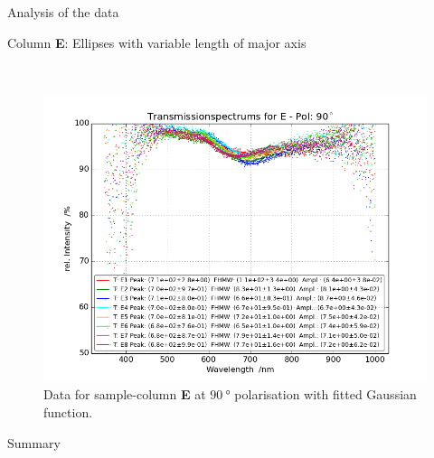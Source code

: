 \documentclass[pdftex, a4paper,11pt, twoside, UKenglish]{report}
\begin{document}
\begin{chapter}{Analysis of the data}
\begin{section}{Column \textbf{E}: Ellipses with variable length of
        major axis}
\begin{figure}[ht!]
\begin{minipage}{.95\textwidth}
          \label{fig:TransspecFIT_EPol0}
        \end{minipage}\\
        \begin{minipage}{.95\textwidth}
          \centering
          \includegraphics[width=\textwidth]
              {Figures/TransspecFIT_EPol90.png}
          \caption{Data for sample-column \textbf{E} at $\SI{90}{\degree}$
              polarisation with fitted Gaussian function.}
          \label{fig:TransspecFIT_EPol90}
        \end{minipage}
      \end{figure}
      
    \end{section}
    
    
    
    \begin{section}{Summary}
      \label{chp:AnalysisSummary}
      
      
      
    \end{section}
   
  \end{chapter}
  
  
  
  
  
  
  
  \begin{thebibliography}{99}
    \scriptsize
    
  \end{thebibliography}
 
\end{document}
